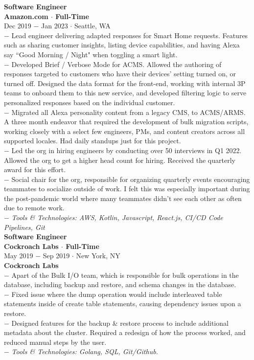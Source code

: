 \documentclass{resume}
\begin{document}
\begin{flushleft}
\normalsize{\bf Software Engineer}\\
\footnotesize{\bf Amazon.com $\cdot$ Full-Time}\\
\footnotesize{Dec 2019 $-$ Jan 2023 $\cdot$ Seattle, WA}\\[1mm]
{\scriptsize
	$-$ Lead engineer delivering adapted responses for Smart Home requests. Features such as sharing customer insights, listing device capabilities, and having Alexa say ``Good Morning / Night" when toggling a smart light. \\
	$-$ Developed Brief / Verbose Mode for ACMS. Allowed the authoring of responses targeted to customers who have their devices' setting turned on, or turned off. Designed the data format for the front-end, working with internal 3P teams to onboard them to this new service, and developed filtering logic to serve personalized responses based on the individual customer. \\
	$-$ Migrated all Alexa personality content from a legacy CMS, to ACMS/ARMS. A three month endeavor that required the development of bulk migration scripts, working closely with a select few engineers, PMs, and content creators across all supported locales. Had daily standups just for this project. \\
	$-$ Led the org in hiring engineers by conducting over 50 interviews in Q1 2022. Allowed the org to get a higher head count for hiring. Received the quarterly award for this effort. \\
	$-$ Social chair for the org, responsible for organizing quarterly events encouraging teammates to socialize outside of work. I felt this was especially important during the post-pandemic world where many teammates didn't see each other as often due to remote work. \\
	$-$ \textit{Tools \& Technologies: AWS, Kotlin, Javascript, React.js, CI/CD Code Pipelines, Git}
}\\[3mm]

\newpage
\normalsize{\bf Software Engineer}\\
\footnotesize{\bf Cockroach Labs $\cdot$ Full-Time}\\
\footnotesize{May 2019  $-$ Sep 2019 $\cdot$ New York, NY}\\[1mm]
\textbf{Cockroach Labs}\\
{\scriptsize
	$-$ Apart of the Bulk I/O team, which is responsible for bulk operations in the database, including backup and restore, and schema changes in the database. \\
	$-$ Fixed issue where the dump operation would include interleaved table statements inside of create table statements, causing dependency issues upon a restore. \\
	$-$ Designed features for the backup \& restore process to include additional metadata about the cluster. Required a redesign of how the process worked, and reduced manual steps by the user. \\
	$-$ \textit{Tools \& Technologies: Golang, SQL, Git/Github.}\\[3mm]
}


\end{flushleft}
\end{document}
